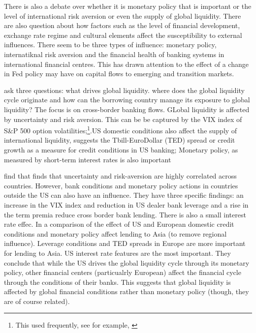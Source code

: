 \documentclass[12pt, a4paper, oneside]{article} %
\begin{document}
There is also a debate over whether it is monetary policy that is important or the level of international risk aversion or even the supply of global liquidity. There are also question about how factors such as the level of financial development, exchange rate regime and cultural elements affect the susceptibility to external influences.  There seem to be three types of influence:  monetary policy, internatiknal risk aversion and the financial health of banking systems in international financial centres.  This has drawn attention to the effect of a change in Fed policy may have on capital flows to emerging and transition markets.  

\citet{Cerutti2014} ask three questions:  what drives global liquidity. where does the global liquidity cycle originate and how can the borrowing country manage its exposure to global liquidity? The focus is on cross-border banking flows. GLobal liquidity is affected by uncertainty and risk aversion.  This can be be captured by the VIX index of S\&P 500 option volatilities;\footnote{This used frequently, see for example, \citet{Rey2013}}.US domestic conditions also affect the supply of international liquidity, \citet{Bruno2014} suggests the Tbill-EuroDollar (TED) spread or credit growth as a measure for credit conditions in US banking; Monetary policy, as measured by short-term interest rates is also important 

\citet{Cerutti2014} find that finds that uncertainty and risk-aversion are highly correlated across countries. However, bank conditions and monetary policy actions in countries outside the US can also have an influence. They have three specific findings:  an increase in the VIX index and reduction in US dealer bank leverage and a rise in the term premia reduce cross border bank lending.  There is also a small interest rate effec.  In a comparison of the effect of US and European domestic credit conditions and monetary policy affect lending to Asia (to remove regional influence).  Leverage conditions and TED spreads in Europe are more important for lending to Asia.  US interest rate features are the most important. They conclude that while the US drives the global liquidity cycle through its monetary policy, other financial centers (particualrly European) affect the financial cycle through the conditions of their banks. This suggests that global liquidity is affected by global financial conditions rather than monetary policy (though, they are of course related). 
\end{document}
